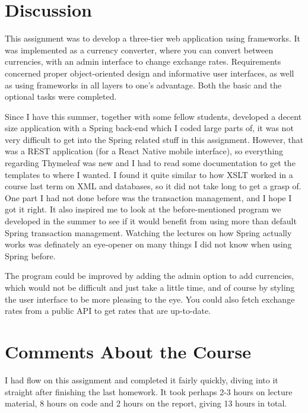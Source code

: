 \documentclass[a4paper]{scrartcl}
\begin{document}
\section{Discussion}

This assignment was to develop a three-tier web application using frameworks. It was implemented as a currency converter, where you can convert between currencies, with an admin interface to change exchange rates. Requirements concerned proper object-oriented design and informative user interfaces, as well as using frameworks in all layers to one's advantage. Both the basic and the optional tasks were completed.

Since I have this summer, together with some fellow students, developed a decent size application with a Spring back-end which I coded large parts of, it was not very difficult to get into the Spring related stuff in this assignment. However, that was a REST application (for a React Native mobile interface), so everything regarding Thymeleaf was new and I had to read some documentation to get the templates to where I wanted. I found it quite similar to how XSLT worked in a course last term on XML and databases, so it did not take long to get a grasp of. One part I had not done before was the transaction management, and I hope I got it right. It also inspired me to look at the before-mentioned program we developed in the summer to see if it would benefit from using more than default Spring transaction management. Watching the lectures on how Spring actually works was definately an eye-opener on many things I did not know when using Spring before.

The program could be improved by adding the admin option to add currencies, which would not be difficult and just take a little time, and of course by styling the user interface to be more pleasing to the eye. You could also fetch exchange rates from a public API to get rates that are up-to-date.

\section{Comments About the Course}

I had flow on this assignment and completed it fairly quickly, diving into it straight after finishing the last homework. It took perhaps 2-3 hours on lecture material, 8 hours on code and 2 hours on the report, giving 13 hours in total.
\end{document}
